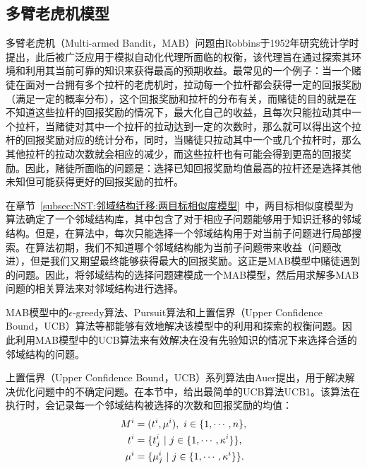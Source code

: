 \subsection{多臂老虎机模型}
\label{subsec:NST:邻域结构迁移:多臂老虎机模型}
多臂老虎机（Multi-armed Bandit，MAB）问题由Robbins于1952年研究统计学时提出\cite{robbins1952some}，此后被广泛应用于模拟自动化代理所面临的权衡，该代理旨在通过探索其环境和利用其当前可靠的知识来获得最高的预期收益\cite{kuleshov2014algorithms}。最常见的一个例子：当一个赌徒在面对一台拥有多个拉杆的老虎机时，拉动每一个拉杆都会获得一定的回报奖励（满足一定的概率分布），这个回报奖励和拉杆的分布有关，而赌徒的目的就是在不知道这些拉杆的回报奖励的情况下，最大化自己的收益，且每次只能拉动其中一个拉杆，当赌徒对其中一个拉杆的拉动达到一定的次数时，那么就可以得出这个拉杆的回报奖励对应的统计分布，同时，当赌徒只拉动其中一个或几个拉杆时，那么其他拉杆的拉动次数就会相应的减少，而这些拉杆也有可能会得到更高的回报奖励\cite{曹修山2018基于}。因此，赌徒所面临的问题是：选择已知回报奖励均值最高的拉杆还是选择其他未知但可能获得更好的回报奖励的拉杆\cite{曹修山2018基于,gittins1979bandit}。
\par
在章节~\ref{subsec:NST:邻域结构迁移:两目标相似度模型}~中，两目标相似度模型为算法确定了一个邻域结构库，其中包含了对于相应子问题能够用于知识迁移的邻域结构。但是，在算法中，每次只能选择一个邻域结构用于对当前子问题进行局部搜索。在算法初期，我们不知道哪个邻域结构能为当前子问题带来收益（问题改进），但是我们又期望最终能够获得最大的回报奖励。这正是MAB模型中赌徒遇到的问题。因此，将邻域结构的选择问题建模成一个MAB模型，然后用求解多MAB问题的相关算法来对邻域结构进行选择。
\par
MAB模型中的$\epsilon$-greedy算法\cite{cesa1998finite,vermorel2005multi}、Pursuit算法\cite{thathachar1984class,sutton2018reinforcement}和上置信界（Upper Confidence Bound，UCB）算法\cite{auer2002using,garivier2008upper,slivkins2011contextual}等都能够有效地解决该模型中的利用和探索的权衡问题。因此利用MAB模型中的UCB算法来有效解决在没有先验知识的情况下来选择合适的邻域结构的问题。
\par
上置信界（Upper Confidence Bound，UCB）系列算法由Auer提出\cite{auer2002using}，用于解决解决优化问题中的不确定问题。在本节中，给出最简单的UCB算法UCB1。该算法在执行时，会记录每一个邻域结构被选择的次数和回报奖励的均值：
\vspace{-1em}
\begin{align}
    \label{eq:MAB Model}
    M^i &= (t^i, \mu^i), \ i \in \{ 1, \cdots, n \}, \\
    t^i &= \{t^i_j \ | \ j \in \{1,\cdots,\kappa^i\} \}, \notag \\
    \mu^i &= \{\mu^i_j \ | \ j \in \{1,\cdots,\kappa^i\} \}. \notag
\end{align}
